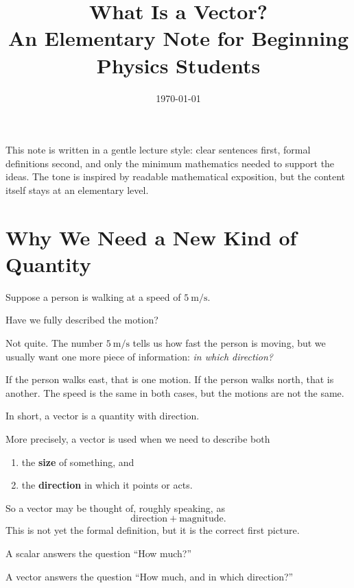 \documentclass[11pt,a4paper]{article}
\title{What Is a Vector?\\\large An Elementary Note for Beginning Physics Students}
\author{}
\date{\today}
\begin{document}
\maketitle

\begin{keypointblock}
This note is written in a gentle lecture style: clear sentences first, formal definitions second,
and only the minimum mathematics needed to support the ideas. The tone is inspired by readable
mathematical exposition, but the content itself stays at an elementary level.
\end{keypointblock}

\tableofcontents
\newpage

\section{Why We Need a New Kind of Quantity}

\begin{problemblock}
Suppose a person is walking at a speed of \(5\ \mathrm{m/s}\).

Have we fully described the motion?
\end{problemblock}

Not quite. The number \(5\ \mathrm{m/s}\) tells us how fast the person is moving,
but we usually want one more piece of information: \emph{in which direction?}

If the person walks east, that is one motion. If the person walks north, that is another.
The speed is the same in both cases, but the motions are not the same.

\begin{intuitionblock}
In short, a vector is a quantity with direction.

More precisely, a vector is used when we need to describe both
\begin{enumerate}[label=\arabic*.]
  \item the \textbf{size} of something, and
  \item the \textbf{direction} in which it points or acts.
\end{enumerate}
\end{intuitionblock}

So a vector may be thought of, roughly speaking, as
\[
\text{direction} + \text{magnitude}.
\]
This is not yet the formal definition, but it is the correct first picture.

\begin{keypointblock}
A scalar answers the question ``How much?''

A vector answers the question ``How much, and in which direction?''
\end{keypointblock}
\end{document}
